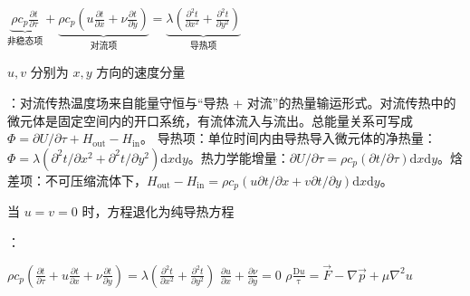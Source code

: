 
$\underbrace{\rho c_p\frac{\partial t}{\partial\tau}}_{\text{非稳态项}}+\underbrace{\rho c_p(u\frac{\partial t}{\partial x}+\nu\frac{\partial t}{\partial y})}_{\text{对流项}}=\underbrace{\lambda(\frac{\partial^2t}{\partial x^2}+\frac{\partial^2t}{\partial y^2})}_{\text{导热项}}$

$u,v$ 分别为 $x,y$ 方向的速度分量

：对流传热温度场来自能量守恒与“导热 + 对流”的热量输运形式。对流传热中的微元体是固定空间内的开口系统，有流体流入与流出。总能量关系可写成 $\Phi=\partial U/\partial \tau+H_{\mathrm{out}}-H_{\mathrm{in}}$。 导热项：单位时间内由导热导入微元体的净热量：$\Phi=\lambda(\partial^2 t/\partial x^2+\partial^2 t/\partial y^2)\mathrm{d}x\mathrm{d}y$。热力学能增量：$\partial U/\partial \tau=\rho c_p(\partial t/\partial \tau)\mathrm{d}x\mathrm{d}y$。焓差项：不可压缩流体下，$H_{\mathrm{out}}-H_{\mathrm{in}}=\rho c_p(u\partial t/\partial x+v\partial t/\partial y)\mathrm{d}x\mathrm{d}y$。

当 $u=v=0$ 时，方程退化为纯导热方程

：

$\rho c_{p}\left(\frac{\partial t}{\partial\tau}+u\frac{\partial t}{\partial x}+\nu\frac{\partial t}{\partial y}\right)=\lambda\left(\frac{\partial^{2}t}{\partial x^{2}}+\frac{\partial^{2}t}{\partial y^{2}}\right)$
 $\frac{\partial u}{\partial x}+\frac{\partial\nu}{\partial y}=0$
$\rho\frac{\mathrm{D}u}{\mathrm{\tau}}=\vec{F}-\nabla \vec{p}+\mu\nabla^2u$


